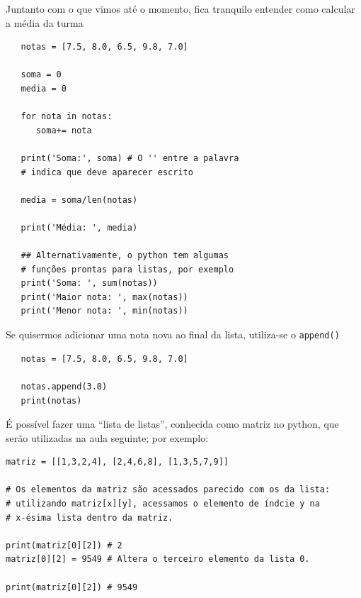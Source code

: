 \documentclass[../numerical_methods.tex]{subfiles}
\begin{document}
Juntanto com o que vimos até o momento, fica tranquilo entender como calcular a média da turma

\begin{listing}
	\caption{Média das Notas}
	\begin{verbatim}
   notas = [7.5, 8.0, 6.5, 9.8, 7.0]

   soma = 0
   media = 0

   for nota in notas:
      soma+= nota

   print('Soma:', soma) # O '' entre a palavra 
   # indica que deve aparecer escrito
   
   media = soma/len(notas)

   print('Média: ', media)

   ## Alternativamente, o python tem algumas 
   # funções prontas para listas, por exemplo
   print('Soma: ', sum(notas))
   print('Maior nota: ', max(notas))
   print('Menor nota: ', min(notas))
 \end{verbatim}
\end{listing}

Se quisermos adicionar uma nota nova ao final da lista, utiliza-se o \texttt{append()}
\begin{verbatim}
   notas = [7.5, 8.0, 6.5, 9.8, 7.0]

   notas.append(3.0)
   print(notas)
\end{verbatim}

É possível fazer uma ``lista de listas'', conhecida como matriz no python, que serão utilizadas na aula seguinte; por exemplo:
\begin{verbatim}
matriz = [[1,3,2,4], [2,4,6,8], [1,3,5,7,9]]

# Os elementos da matriz são acessados parecido com os da lista: 
# utilizando matriz[x][y], acessamos o elemento de índcie y na 
# x-ésima lista dentro da matriz. 

print(matriz[0][2]) # 2
matriz[0][2] = 9549 # Altera o terceiro elemento da lista 0.

print(matriz[0][2]) # 9549
\end{verbatim}
\end{document}

